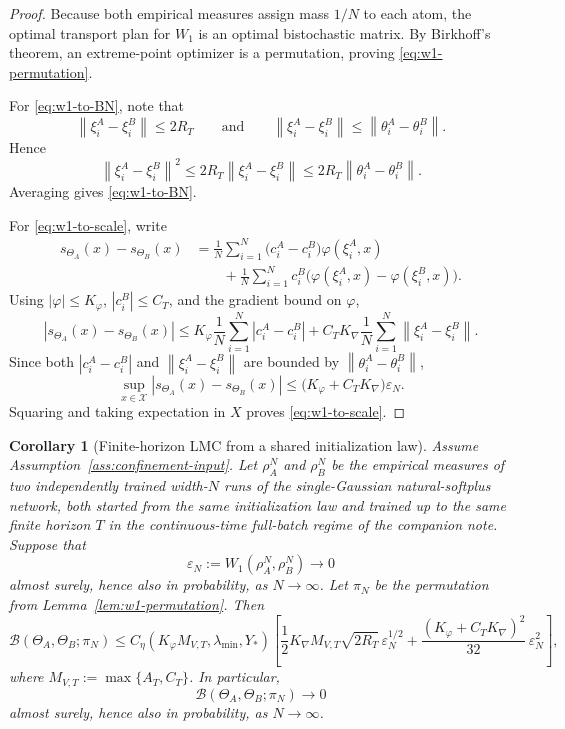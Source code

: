 \documentclass[11pt]{article}
\newtheorem{corollary}[theorem]{Corollary}
\theoremstyle{definition}
\newcommand{\norm}[1]{\left\lVert #1 \right\rVert}
\newcommand{\mc}[1]{\mathcal{#1}}
\newcommand{\cB}{\mathcal{B}}
\begin{document}
\begin{proof}
Because both empirical measures assign mass $1/N$ to each atom, the optimal
transport plan for $W_1$ is an optimal bistochastic matrix. By Birkhoff's
theorem, an extreme-point optimizer is a permutation, proving
\eqref{eq:w1-permutation}.

For \eqref{eq:w1-to-BN}, note that
\[
  \norm{\xi_i^A-\xi_i^B}\le 2R_T
  \qquad\text{and}\qquad
  \norm{\xi_i^A-\xi_i^B}\le \norm{\theta_i^A-\theta_i^B}.
\]
Hence
\[
  \norm{\xi_i^A-\xi_i^B}^2
  \le
  2R_T \norm{\xi_i^A-\xi_i^B}
  \le
  2R_T \norm{\theta_i^A-\theta_i^B}.
\]
Averaging gives \eqref{eq:w1-to-BN}.

For \eqref{eq:w1-to-scale}, write
\begin{align*}
  s_{\Theta_A}(x)-s_{\Theta_B}(x)
  &=
  \frac1N\sum_{i=1}^N
  \bigl(c_i^A-c_i^B\bigr)\varphi(\xi_i^A,x)
  \\
  &\qquad
  +
  \frac1N\sum_{i=1}^N
  c_i^B\bigl(\varphi(\xi_i^A,x)-\varphi(\xi_i^B,x)\bigr).
\end{align*}
Using $|\varphi|\le K_\varphi$, $|c_i^B|\le C_T$, and the gradient bound on
$\varphi$,
\[
  |s_{\Theta_A}(x)-s_{\Theta_B}(x)|
  \le
  K_\varphi \frac1N\sum_{i=1}^N |c_i^A-c_i^B|
  +
  C_T K_{\nabla}\frac1N\sum_{i=1}^N \norm{\xi_i^A-\xi_i^B}.
\]
Since both $|c_i^A-c_i^B|$ and $\norm{\xi_i^A-\xi_i^B}$ are bounded by
$\norm{\theta_i^A-\theta_i^B}$,
\[
  \sup_{x\in\mc{X}} |s_{\Theta_A}(x)-s_{\Theta_B}(x)|
  \le
  \bigl(K_\varphi + C_T K_{\nabla}\bigr)\varepsilon_N.
\]
Squaring and taking expectation in $X$ proves \eqref{eq:w1-to-scale}.
\end{proof}

\begin{corollary}[Finite-horizon LMC from a shared initialization law]
\label{cor:lmc-from-common-path}
Assume Assumption~\ref{ass:confinement-input}. Let $\rho_A^N$ and $\rho_B^N$
be the empirical measures of two independently trained width-$N$ runs of the
single-Gaussian natural-softplus network, both started from the same
initialization law and trained up to the same finite horizon $T$ in the
continuous-time full-batch regime of the companion note. Suppose that
\[
  \varepsilon_N:=W_1(\rho_A^N,\rho_B^N)\to 0
\]
almost surely, hence also in probability, as $N\to\infty$.
Let $\pi_N$ be the permutation from Lemma~\ref{lem:w1-permutation}. Then
\begin{equation}
  \cB(\Theta_A,\Theta_B;\pi_N)
  \le
  C_\eta(K_\varphi M_{V,T},\lambda_{\min},Y_\ast)
  \left[
    \frac12 K_{\nabla} M_{V,T}\sqrt{2R_T}\,\varepsilon_N^{1/2}
    +
    \frac{(K_\varphi + C_TK_{\nabla})^2}{32}\,\varepsilon_N^2
  \right],
  \label{eq:lmc-common-path-bound}
\end{equation}
where $M_{V,T}:=\max\{A_T,C_T\}$. In particular,
\[
  \cB(\Theta_A,\Theta_B;\pi_N)\to 0
\]
almost surely, hence also in probability, as $N\to\infty$.
\end{corollary}
\end{document}
